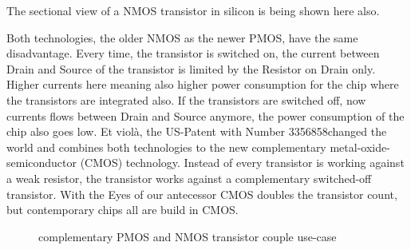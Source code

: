 \documentclass[10pt,a4paper,oneside]{article}
\begin{document}
The sectional view of a NMOS transistor in silicon is being shown here also.
\begin{center}
\end{center}

Both technologies, the older NMOS as the newer PMOS, have the same disadvantage. Every time, the transistor is switched on, the current between Drain and Source of the transistor is limited by the Resistor on Drain only. Higher currents here meaning also higher power consumption for the chip where the transistors are integrated also. If the transistors are switched off, now currents flows between Drain and Source anymore, the power consumption of the chip also goes low.
Et violà, the US-Patent with Number 3356858\footnotemark changed the world and combines both technologies to the new complementary metal-oxide-semiconductor (CMOS) technology. Instead of every transistor is working against a weak resistor, the transistor works against a complementary switched-off transistor. With the Eyes of our antecessor CMOS doubles the transistor count, but contemporary chips all are build in CMOS.

\begin{center}
	\begin{figure}[h]
		\begin{center}
			\begin{circuitdiagram}[draft*]{20}{20}
			\end{circuitdiagram}
		\end{center}
		\caption{complementary PMOS and NMOS transistor couple use-case}
	\end{figure}
\end{center}
\end{document}
